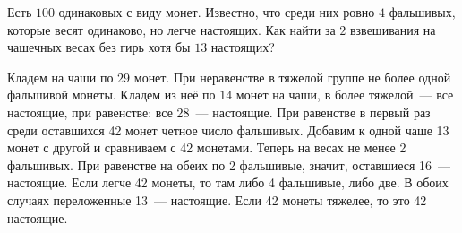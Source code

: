 \problem
Есть $100$ одинаковых с виду монет.
Известно, что среди них ровно $4$ фальшивых, которые весят одинаково, но легче
настоящих.
Как найти за $2$ взвешивания на чашечных весах без гирь хотя бы $13$ настоящих?

\solution
Кладем на чаши по $29$ монет.
При неравенстве в тяжелой группе не более одной фальшивой монеты.
Кладем из неё по $14$ монет на чаши, в более тяжелой~--- все настоящие, при
равенстве: все 28~--- настоящие.
При равенстве в первый раз среди оставшихся 42 монет четное число фальшивых.
Добавим к одной чаше 13 монет с другой и сравниваем с 42 монетами.
Теперь на весах не менее 2 фальшивых.
При равенстве на обеих по 2 фальшивые, значит, оставшиеся 16~--- настоящие.
Если легче 42 монеты, то там либо 4 фальшивые, либо две.
В обоих случаях переложенные 13~--- настоящие.
Если 42 монеты тяжелее, то это 42 настоящие.

\endproblem
